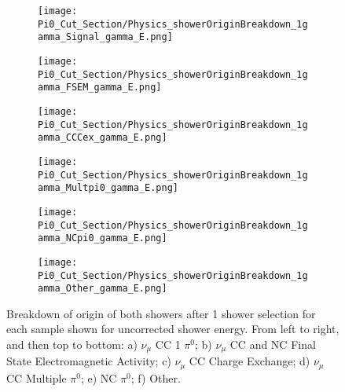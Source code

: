 \documentclass{article}
\begin{document}
\clearpage
\begin{figure}[H]
\centering
  \begin{subfigure}[H]{0.25\textwidth}
    \centering
\texttt{[image: Pi0\_Cut\_Section/Physics\_showerOriginBreakdown\_1gamma\_Signal\_gamma\_E.png]}
  \caption{ }
  \end{subfigure} 
  \hspace{4mm}
  \begin{subfigure}[H]{0.25\textwidth}
    \centering
\texttt{[image: Pi0\_Cut\_Section/Physics\_showerOriginBreakdown\_1gamma\_FSEM\_gamma\_E.png]}
  \caption{ }
  \end{subfigure} 
  \hspace{4mm}
  \begin{subfigure}[H]{0.25\textwidth}
    \centering
\texttt{[image: Pi0\_Cut\_Section/Physics\_showerOriginBreakdown\_1gamma\_CCCex\_gamma\_E.png]}
  \caption{ }
  \end{subfigure} 
  \hspace{4mm}
  \begin{subfigure}[H]{0.25\textwidth}
    \centering
\texttt{[image: Pi0\_Cut\_Section/Physics\_showerOriginBreakdown\_1gamma\_Multpi0\_gamma\_E.png]}
  \caption{ }
  \end{subfigure} 
  \hspace{4mm}
  \begin{subfigure}[H]{0.25\textwidth}
    \centering
\texttt{[image: Pi0\_Cut\_Section/Physics\_showerOriginBreakdown\_1gamma\_NCpi0\_gamma\_E.png]}
  \caption{ }
  \end{subfigure} 
  \hspace{4mm}
  \begin{subfigure}[H]{0.25\textwidth}
    \centering
\texttt{[image: Pi0\_Cut\_Section/Physics\_showerOriginBreakdown\_1gamma\_Other\_gamma\_E.png]}
  \caption{ }
  \end{subfigure} 
\caption{ Breakdown of origin of both showers after 1 shower selection for each sample shown for uncorrected shower energy.  From left to right, and then top to bottom: a) $\nu_{\mu}$ CC 1 $\pi^0$; b) $\nu_\mu$ CC and NC Final State Electromagnetic Activity; c) $\nu_{\mu}$ CC Charge Exchange; d) $\nu_\mu$ CC Multiple $\pi^0$; e) NC $\pi^0$; f) Other.  }
\label{fig:physics_showerOriginBreakdown_E}
\end{figure}
\end{document}
